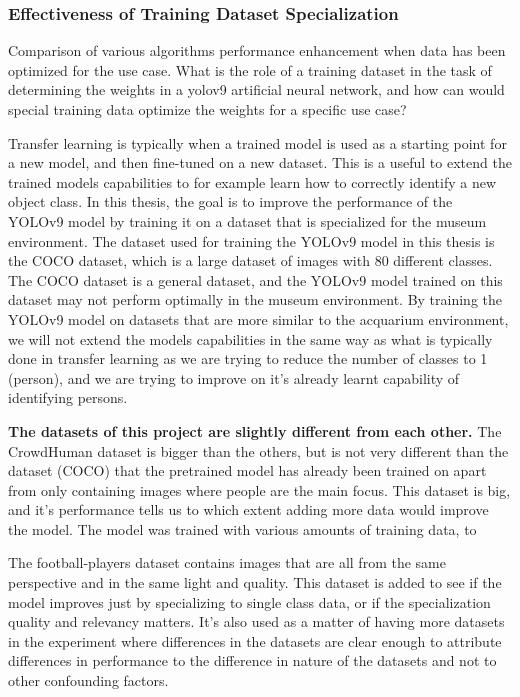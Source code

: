 \subsubsection{Effectiveness of Training Dataset Specialization}
\label{sec:dataset_specialization}
Comparison of various algorithms performance enhancement when data has been optimized for the use case. What is the role of a training dataset in the task of determining the weights in a yolov9 artificial neural network, and how can would special training data optimize the weights for a specific use case?

Transfer learning is typically when a trained model is used as a starting point for a new model, and then fine-tuned on a new dataset. This is a useful to extend the trained models capabilities to for example learn how to correctly identify a new object class. In this thesis, the goal is to improve the performance of the YOLOv9 model by training it on a dataset that is specialized for the museum environment. The dataset used for training the YOLOv9 model in this thesis is the COCO dataset, which is a large dataset of images with 80 different classes. The COCO dataset is a general dataset, and the YOLOv9 model trained on this dataset may not perform optimally in the museum environment. By training the YOLOv9 model on datasets that are more similar to the acquarium environment, we will not extend the models capabilities in the same way as what is typically done in transfer learning as we are trying to reduce the number of classes to 1 (person), and we are trying to improve on it's already learnt capability of identifying persons.

\textbf{The datasets of this project are slightly different from each other.}
The CrowdHuman dataset is bigger than the others, but is not very different than the dataset (COCO) that the pretrained model has already been trained on apart from only containing images where people are the main focus. This dataset is big, and it's performance tells us to which extent adding more data would improve the model. The model was trained with various amounts of training data, to 

The football-players dataset contains images that are all from the same perspective and in the same light and quality. This dataset is added to see if the model improves just by specializing to single class data, or if the specialization quality and relevancy matters. It's also used as a matter of having more datasets in the experiment where differences in the datasets are clear enough to attribute differences in performance to the difference in nature of the datasets and not to other confounding factors. 

